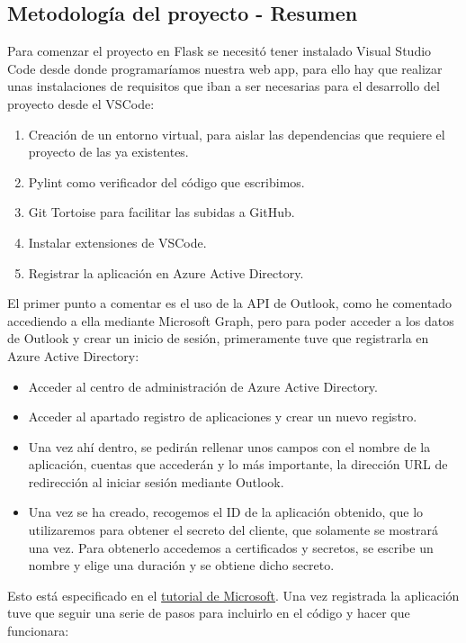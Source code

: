 \subsection{Metodología del proyecto - Resumen}
Para comenzar el proyecto en Flask se necesitó tener instalado Visual Studio Code desde donde programaríamos nuestra web app, para ello hay que realizar unas instalaciones de requisitos que iban a ser necesarias para el desarrollo del proyecto desde el VSCode:
\begin{enumerate}
    \item Creación de un entorno virtual, para aislar las dependencias que requiere el proyecto de las ya existentes.
    \item Pylint como verificador del código que escribimos.
    \item Git Tortoise para facilitar las subidas a GitHub.
    \item Instalar extensiones de VSCode.
    \item Registrar la aplicación en Azure Active Directory.
\end{enumerate}
El primer punto a comentar es el uso de la API de Outlook, como he comentado accediendo a ella mediante Microsoft Graph, pero para poder acceder a los datos de Outlook y crear un inicio de sesión, primeramente tuve que registrarla en Azure Active Directory:
\begin{itemize}
    \item Acceder al centro de administración de Azure Active Directory.
    \item Acceder al apartado registro de aplicaciones y crear un nuevo registro.
    \item Una vez ahí dentro, se pedirán rellenar unos campos con el nombre de la aplicación, cuentas que accederán y lo más importante, la dirección URL de redirección al iniciar sesión mediante Outlook.
    \item Una vez se ha creado, recogemos el ID de la aplicación obtenido, que lo utilizaremos para obtener el secreto del cliente, que solamente se mostrará una vez. Para obtenerlo accedemos a certificados y secretos, se escribe un nombre y elige una duración y se obtiene dicho secreto.
\end{itemize}
Esto está especificado en el \href{https://docs.microsoft.com/es-es/graph/tutorials/python}{tutorial de Microsoft}\cite{pythonMicrosoftGraph}. \newline
Una vez registrada la aplicación tuve que seguir una serie de pasos para incluirlo en el código y hacer que funcionara:
